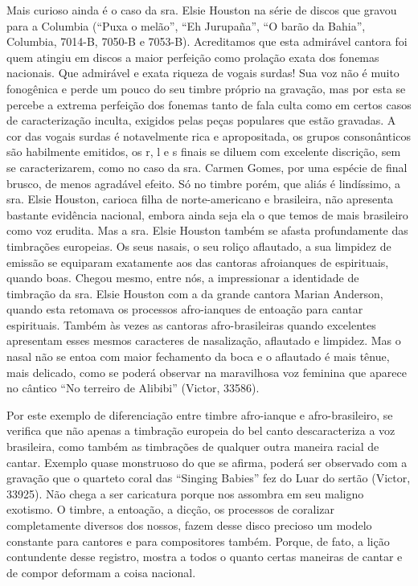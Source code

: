 Mais curioso ainda é o caso da sra. Elsie Houston na série de discos que
gravou para a Columbia (``Puxa o melão'', ``Eh Jurupaña'', ``O barão da
Bahia'', Columbia, 7014-B, 7050-B e 7053-B). Acreditamos que esta
admirável cantora foi quem atingiu em discos a maior perfeição como
prolação exata dos fonemas nacionais. Que admirável e exata riqueza de
vogais surdas! Sua voz não é muito fonogênica e perde um pouco do seu
timbre próprio na gravação, mas por esta se percebe a extrema perfeição
dos fonemas tanto de fala culta como em certos casos de caracterização
inculta, exigidos pelas peças populares que estão gravadas. A cor das
vogais surdas é notavelmente rica e apropositada, os grupos
consonânticos são habilmente emitidos, os r, l e s finais se diluem com
excelente discrição, sem se caracterizarem, como no caso da sra. Carmen
Gomes, por uma espécie de final brusco, de menos agradável efeito. Só no
timbre porém, que aliás é lindíssimo, a sra. Elsie Houston, carioca
filha de norte-americano e brasileira, não apresenta bastante evidência
nacional, embora ainda seja ela o que temos de mais brasileiro como voz
erudita. Mas a sra. Elsie Houston também se afasta profundamente das
timbrações europeias. Os seus nasais, o seu roliço aflautado, a sua
limpidez de emissão se equiparam exatamente aos das cantoras afroianques
de espirituais, quando boas. Chegou mesmo, entre nós, a impressionar a
identidade de timbração da sra. Elsie Houston com a da grande cantora
Marian Anderson, quando esta retomava os processos afro-ianques de
entoação para cantar espirituais. Também às vezes as cantoras
afro-brasileiras quando excelentes apresentam esses mesmos caracteres de
nasalização, aflautado e limpidez. Mas o nasal não se entoa com maior
fechamento da boca e o aflautado é mais tênue, mais delicado, como se
poderá observar na maravilhosa voz feminina que aparece no cântico ``No
terreiro de Alibibi'' (Victor, 33586).

Por este exemplo de diferenciação entre timbre afro-ianque e
afro-brasileiro, se verifica que não apenas a timbração europeia do bel
canto descaracteriza a voz brasileira, como também as timbrações de
qualquer outra maneira racial de cantar. Exemplo quase monstruoso do que
se afirma, poderá ser observado com a gravação que o quarteto coral das
``Singing Babies'' fez do Luar do sertão (Victor, 33925). Não chega a
ser caricatura porque nos assombra em seu maligno exotismo. O timbre, a
entoação, a dicção, os processos de coralizar completamente diversos dos
nossos, fazem desse disco precioso um modelo constante para cantores e
para compositores também. Porque, de fato, a lição contundente desse
registro, mostra a todos o quanto certas maneiras de cantar e de compor
deformam a coisa nacional.


